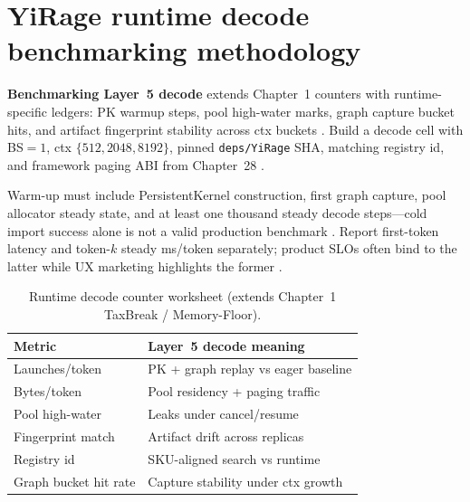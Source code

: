 \section{YiRage runtime decode benchmarking methodology}
\label{sec:ch29_runtime_benchmark}

\textbf{Benchmarking Layer~5 decode} extends Chapter~1 counters with runtime-specific ledgers: PK warmup steps, pool high-water marks, graph capture bucket hits, and artifact fingerprint stability across ctx buckets \citep{yirage2026,chen2020compilerbasedhardw,patel2025llminference,taxbreak2026,memoryfloor2026,kwon2023vllm,liu2024deepseekv3,nvidia2024cudagraphs,dao2022flashattention,dao2023flashdecoding,nvidia2022hopper,semianalysis2024tma,amd2024xdna,amd2024aie,dlbook}. Build a decode cell with BS${=}1$, ctx $\{512,2048,8192\}$, pinned \texttt{deps/YiRage} SHA, matching registry id, and framework paging ABI from Chapter~28 \citep{kwon2023vllm,yirage2026,chen2020compilerbasedhardw,patel2025llminference,taxbreak2026,memoryfloor2026,liu2024deepseekv3,nvidia2024cudagraphs,dao2022flashattention,amd2024xdna,amd2024aie,dao2023flashdecoding,nvidia2022hopper,semianalysis2024tma,dlbook}.

Warm-up must include PersistentKernel construction, first graph capture, pool allocator steady state, and at least one thousand steady decode steps---cold import success alone is not a valid production benchmark \citep{yirage2026,chen2020compilerbasedhardw,patel2025llminference,nvidia2024cudagraphs,memoryfloor2026,taxbreak2026,kwon2023vllm,liu2024deepseekv3,dao2022flashattention,amd2024xdna,amd2024aie,dao2023flashdecoding,nvidia2022hopper,semianalysis2024tma,dlbook}. Report first-token latency and token-$k$ steady ms/token separately; product SLOs often bind to the latter while UX marketing highlights the former \citep{patel2025llminference,kwon2023vllm,yirage2026,chen2020compilerbasedhardw,memoryfloor2026,taxbreak2026,liu2024deepseekv3,nvidia2024cudagraphs,dao2022flashattention,amd2024aie,amd2024xdna,dao2023flashdecoding,nvidia2022hopper,semianalysis2024tma,dlbook}.

\begin{table}[t]
\centering
\small
\begin{tabular}{@{}ll@{}}
\toprule
\textbf{Metric} & \textbf{Layer~5 decode meaning} \\
\midrule
Launches/token & PK + graph replay vs eager baseline \\
Bytes/token & Pool residency + paging traffic \\
Pool high-water & Leaks under cancel/resume \\
Fingerprint match & Artifact drift across replicas \\
Registry id & SKU-aligned search vs runtime \\
Graph bucket hit rate & Capture stability under ctx growth \\
\bottomrule
\end{tabular}
\caption{Runtime decode counter worksheet (extends Chapter~1 TaxBreak / Memory-Floor).}
\label{tab:ch29_runtime_benchmark}
\end{table}

